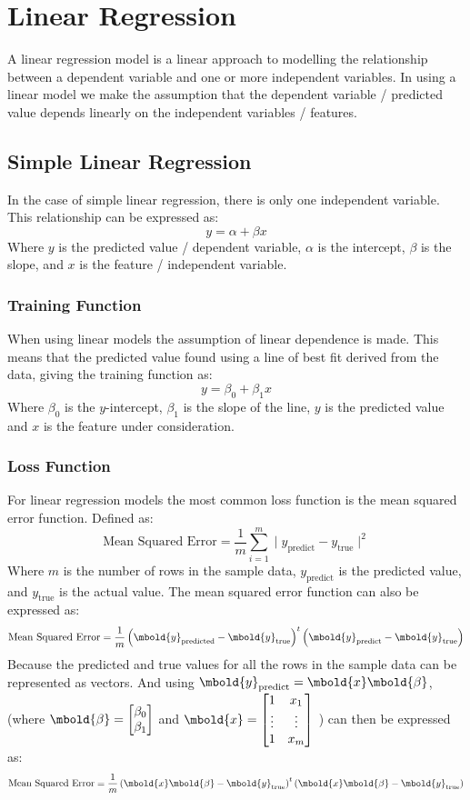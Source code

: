 \documentclass[12pt letter]{report}
\begin{document}
\section{Linear Regression}
A linear regression model is a linear approach to modelling the relationship between a dependent variable and one or
more independent variables. In using a linear model we make the assumption that the dependent variable / predicted value
depends linearly on the independent variables / features.
\subsection{Simple Linear Regression}
In the case of simple linear regression, there is only one independent variable. This relationship can be expressed as:
\[
  y = \alpha + \beta x
\]
Where $y$ is the predicted value / dependent variable, $\alpha$ is the intercept, $\beta$ is the slope, and $x$ is the
feature / independent variable.

\subsubsection{Training Function}

When using linear models the assumption of linear dependence is made. This means that the predicted value found using a
line of best fit derived from the data, giving the training function as:
\[
  y = \beta_0 + \beta_1 x
\]
Where $\beta_0$ is the $y$-intercept, $\beta_1$ is the slope of the line, $y$ is the predicted value and $x$ is the feature
under consideration.

\subsubsection{Loss Function}

For linear regression models the most common loss function is the mean squared error function. Defined as:
\[
  \text{Mean Squared Error} = \frac{1}{m} \displaystyle\sum_{i=1}^{m}  \mid  y_{\text{predict}} - y_{\text{true}}
  \mid ^2
\]
Where $m$ is the number of rows in the sample data, $y_{\text{predict}}$ is the predicted value, and $y_{\text{true}}$ is
the actual value. The mean squared error function can also be expressed as:
\[
  \text{Mean Squared Error} = \frac{1}{m} \left( \mbold{y}_{\text{predicted}} - \mbold{y}_{\text{true}}  \right)^{t}
  \left( \mbold{y}_{\text{predict}} - \mbold{y}_{\text{true}} \right)
\]
Because the predicted and true values for all the rows in the sample data can be represented as vectors. And using
$\mbold{y}_{\text{predict}} = \mbold{x}\mbold{\beta}$, (where $\mbold{\beta} = \begin{bmatrix} \beta_0 \\ \beta_1
  \end{bmatrix} $ and $\mbold{x} = \begin{bmatrix} 1 & x_1 \\ \vdots & \vdots \\ 1 & x_m \end{bmatrix} $ )  can then
be expressed as:
\[
  \text{Mean Squared Error} = \frac{1}{m} \left( \mbold{x} \mbold{\beta} - \mbold{y}_{\text{true}} \right)^{t} \left( \mbold{x} \mbold{\beta} - \mbold{y}_{\text{true}} \right)
\]
\end{document}
